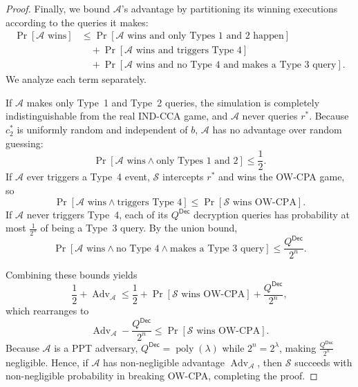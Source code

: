 \begin{proof}
    Finally, we bound \(\mathcal{A}\)'s advantage by partitioning its winning executions according to the queries it makes:
    \begin{align*}
        \Pr[\mathcal{A} \text{ wins}]
        &\le \Pr[\mathcal{A} \text{ wins and only Types 1 and 2 happen}] \\
        &\quad + \Pr[\mathcal{A} \text{ wins and triggers Type 4}] \\
        &\quad + \Pr[\mathcal{A} \text{ wins and no Type 4 and makes a Type 3 query}].
    \end{align*}
    We analyze each term separately.

    If \(\mathcal{A}\) makes only Type~1 and Type~2 queries, the simulation is completely indistinguishable from the real IND-CCA game, and \(\mathcal{A}\) never queries \(r^*\). Because \(c_2^*\) is uniformly random and independent of \(b\), \(\mathcal{A}\) has no advantage over random guessing:
    \[
        \Pr[\mathcal{A} \text{ wins} \land \text{only Types 1 and 2}] \le \frac{1}{2}.
    \]
    If \(\mathcal{A}\) ever triggers a Type~4 event, \(\mathcal{S}\) intercepts \(r^*\) and wins the OW-CPA game, so
    \[
        \Pr[\mathcal{A} \text{ wins} \land \text{triggers Type 4}] \le \Pr[\mathcal{S} \text{ wins OW-CPA}].
    \]
    If \(\mathcal{A}\) never triggers Type~4, each of its \(Q^{\mathsf{Dec}}\) decryption queries has probability at most \(\frac{1}{2^n}\) of being a Type~3 query. By the union bound,
    \[
        \Pr[\mathcal{A} \text{ wins} \land \text{no Type 4} \land \text{makes a Type 3 query}] \le \frac{Q^{\mathsf{Dec}}}{2^n}.
    \]

    Combining these bounds yields
    \[
        \frac{1}{2} + \operatorname{Adv}_{\mathcal{A}} \le \frac{1}{2} + \Pr[\mathcal{S} \text{ wins OW-CPA}] + \frac{Q^{\mathsf{Dec}}}{2^n},
    \]
    which rearranges to
    \[
        \operatorname{Adv}_{\mathcal{A}} - \frac{Q^{\mathsf{Dec}}}{2^n} \le \Pr[\mathcal{S} \text{ wins OW-CPA}].
    \]
    Because \(\mathcal{A}\) is a PPT adversary, \(Q^{\mathsf{Dec}} = \operatorname{poly}(\lambda)\) while \(2^n = 2^\lambda\), making \(\frac{Q^{\mathsf{Dec}}}{2^n}\) negligible.
    Hence, if \(\mathcal{A}\) has non-negligible advantage \(\operatorname{Adv}_{\mathcal{A}}\), then \(\mathcal{S}\) succeeds with non-negligible probability in breaking OW-CPA, completing the proof.
\end{proof}
